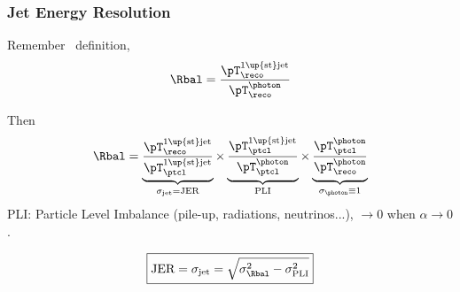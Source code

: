 \begin{frame}
\frametitle{Jet Energy Resolution}
\manip Remember \Rbal\ definition,
\begin{equation*}
\Rbal = \frac{{\pT}^\text{1\up{st}jet}_\reco}{\pT^\photon_\reco}
\end{equation*}

\pause

Then
\begin{equation*}
\Rbal
=
\underbrace{\frac{{\pT}^\text{1\up{st}jet}_\reco}{{\pT}^\text{1\up{st}jet}_\ptcl}}_{\sigma_\text{jet}=\text{JER}}
\times
\underbrace{\frac{{\pT}^\text{1\up{st}jet}_\ptcl}{\pT^\photon_\ptcl}
\vphantom{\frac{{\pT}^\text{1\up{st}jet}_\reco}{{\pT}^\text{1\up{st}jet}_\ptcl}}}_{\text{PLI}}
\times
\underbrace{\frac{\pT^\photon_\ptcl}{\pT^\photon_\reco}
\vphantom{\frac{{\pT}^\text{1\up{st}jet}_\reco}{{\pT}^\text{1\up{st}jet}_\ptcl}}}_{\sigma_\photon\equiv1}
\end{equation*}
\manip PLI: Particle Level Imbalance (pile-up, radiations, neutrinos...), $\to0$ when $\alpha\to0$.

\pause
\begin{equation*}
\boxed{\text{JER} = \sigma_\text{jet} =  \sqrt{\sigma_\Rbal^2 - \sigma_\text{PLI}^2}}
\end{equation*}
\end{frame}

